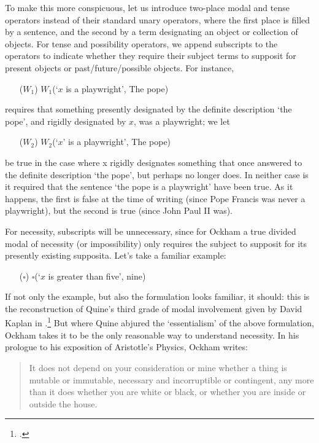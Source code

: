 \documentclass[a4paper]{article}
\begin{document}
To make this more conspicuous, let us introduce two-place modal and tense operators instead of their standard unary operators, where the first place is filled by a sentence, and the second by a term designating an object or collection of objects. For tense and possibility operators, we append subscripts to the operators to indicate whether they require their subject terms to supposit for present objects or past/future/possible objects. For instance, 

\begin{enumerate}
	\item[($W_{1}$)] $W_{1}$(`$x$ is a playwright', The pope)
\end{enumerate}

\noindent requires that something presently designated by the definite description `the pope', and rigidly designated by $x$, was a playwright; we let

\begin{enumerate}
	\item[($W_{2}$)] $W_{2}$(`$x$' is a playwright', The pope)
\end{enumerate}

\noindent be true in the case where x rigidly designates something that once answered to the definite description `the pope', but perhaps no longer does. In neither case is it required that the sentence `the pope is a playwright' have been true. As it happens, the first is false at the time of writing (since Pope Francis was never a playwright), but the second is true (since John Paul II was).

For necessity, subscripts will be unnecessary, since for Ockham a true divided modal of necessity (or impossibility) only requires the subject to supposit for its presently existing supposita. Let's take a familiar example:
\begin{enumerate}
	\item[($\square$)] $\square$(`$x$ is greater than five', nine)
\end{enumerate}

If not only the example, but also the formulation looks familiar, it should: this is the reconstruction of Quine's third grade of modal involvement given by David Kaplan in \cite{Kaplan1968}.\footnote{\cite{Quine1976}.} But where Quine abjured the `essentialism' of the above formulation, Ockham takes it to be the only reasonable way to understand necessity. In his prologue to his exposition of Aristotle's Physics, Ockham writes: 

\begin{quote}
It does not depend on your consideration or mine whether a thing is mutable or immutable, necessary and incorruptible or contingent, any more than it does whether you are white or black, or whether you are inside or outside the house. \cite[p. 14, alt.]{Ockham1957}
\end{quote}
\end{document}
